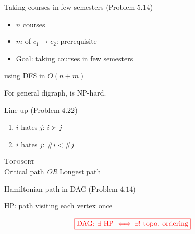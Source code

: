 \begin{frame}{}
  \begin{exampleblock}{Taking courses in few semesters (Problem 5.14)}
    \begin{itemize}
      \item $n$ courses
      \item $m$ of $c_1 \to c_2$: prerequisite
      \item Goal: taking courses in few semesters
    \end{itemize}
  \end{exampleblock}

  \pause
  \vspace{0.60cm}
  \centerline{ using DFS in $O(n + m)$}

  \pause
  \vspace{0.80cm}
  \centerline{For general digraph,  is NP-hard.}
\end{frame}
\begin{frame}{}
  \begin{exampleblock}{Line up (Problem $4.22$)}
    \begin{enumerate}
      \item $i$ hates $j$: $i \succ j$
      \item $i$ hates $j$: $\# i < \# j$
    \end{enumerate}
  \end{exampleblock}

  \vspace{0.50cm}
  \begin{center}
    \textsc{Toposort} \\[8pt]

    Critical path \emph{OR} Longest path
  \end{center}
\end{frame}
\begin{frame}{}
  \begin{exampleblock}{Hamiltonian path in DAG (Problem $4.14$)}
    \begin{center}
      HP: path visiting each vertex once \\[8pt]

    \end{center}
  \end{exampleblock}

  \pause
  \vspace{0.60cm}
  \centerline{}

  \pause
  \vspace{0.50cm}

  \pause
  \[
    \textcolor{red}{\boxed{\text{DAG: } \exists \text{ HP} \iff \exists! \text{ topo. ordering}}}
  \]
\end{frame}
